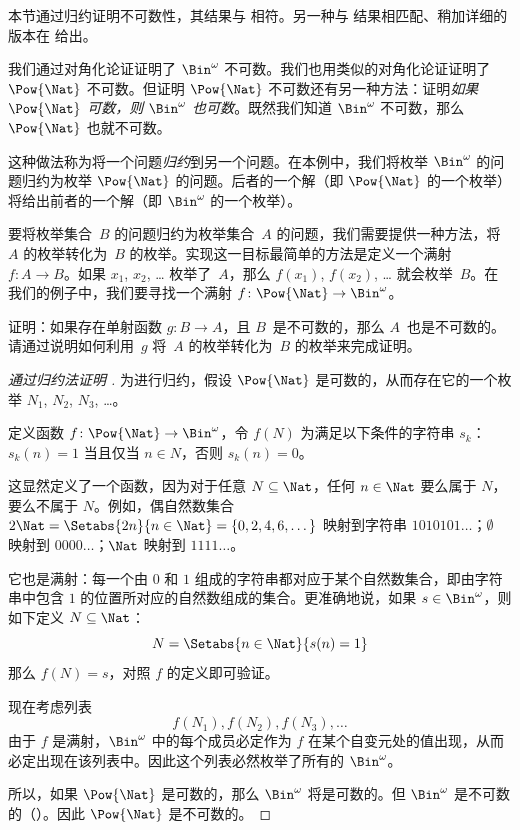 \documentclass[../../../include/open-logic-section]{subfiles}
\begin{document}


\begin{editorial}
  本节通过归约证明不可数性，其结果与  相符。另一种与  结果相匹配、稍加详细的版本在  给出。
\end{editorial}

我们通过对角化论证证明了 $\Bin^\omega$ 不可数。我们也用类似的对角化论证证明了 $\Pow{\Nat}$ 不可数。但证明 $\Pow{\Nat}$ 不可数还有另一种方法：证明\emph{如果 $\Pow{\Nat}$ 可数，则 $\Bin^\omega$ 也可数}。既然我们知道 $\Bin^\omega$ 不可数，那么 $\Pow{\Nat}$ 也就不可数。

这种做法称为将一个问题\emph{归约}到另一个问题。在本例中，我们将枚举 $\Bin^\omega$ 的问题归约为枚举 $\Pow{\Nat}$ 的问题。后者的一个解（即 $\Pow{\Nat}$ 的一个枚举）将给出前者的一个解（即 $\Bin^\omega$ 的一个枚举）。

要将枚举集合~$B$ 的问题归约为枚举集合~$A$ 的问题，我们需要提供一种方法，将~$A$ 的枚举转化为~$B$ 的枚举。实现这一目标最简单的方法是定义一个满射 $f\colon A \to B$。如果 $x_1$, $x_2$, \dots{} 枚举了~$A$，那么 $f(x_1)$, $f(x_2)$, \dots{} 就会枚举~$B$。在我们的例子中，我们要寻找一个满射 $f\colon \Pow{\Nat} \to \Bin^\omega$。

\begin{prob}
证明：如果存在单射函数 $g\colon B \to A$，且 $B$~是不可数的，那么 $A$~也是不可数的。请通过说明如何利用~$g$ 将~$A$ 的枚举转化为~$B$ 的枚举来完成证明。
\end{prob}

\begin{proof}[通过归约法证明 {}]
为进行归约，假设 $\Pow{\Nat}$ 是可数的，从而存在它的一个枚举 $N_{1}$, $N_{2}$, $N_{3}$, \dots。

定义函数 $f \colon \Pow{\Nat} \to \Bin^\omega$，令 $f(N)$ 为满足以下条件的字符串 $s_{k}$：$s_{k}(n) = 1$ 当且仅当 $n \in N$，否则 $s_k(n) = 0$。

这显然定义了一个函数，因为对于任意 $N \subseteq \Nat$，任何 $n \in \Nat$ 要么属于 $N$，要么不属于 $N$。例如，偶自然数集合 $2\Nat = \Setabs{2n}{n \in \Nat} = \{0,2, 4, 6,
\dots\}$ 映射到字符串 $1010101\dots$；$\emptyset$ 映射到 $0000\dots$；$\Nat$ 映射到 $1111\dots$。

它也是满射：每一个由 $0$ 和 $1$ 组成的字符串都对应于某个自然数集合，即由字符串中包含 $1$ 的位置所对应的自然数组成的集合。更准确地说，如果 $s \in \Bin^\omega$，则如下定义 $N \subseteq \Nat$：
\[
N = \Setabs{n \in \Nat}{s(n) = 1}
\]
那么 $f(N) = s$，对照 $f$ 的定义即可验证。

现在考虑列表
\[
f(N_1), f(N_2), f(N_3), \dots
\]
由于 $f$ 是满射，$\Bin^\omega$ 中的每个成员必定作为 $f$ 在某个自变元处的值出现，从而必定出现在该列表中。因此这个列表必然枚举了所有的 $\Bin^\omega$。

所以，如果 $\Pow{\Nat}$ 是可数的，那么 $\Bin^\omega$ 将是可数的。但 $\Bin^\omega$ 是不可数的（）。因此 $\Pow{\Nat}$ 是不可数的。
\end{proof}
\end{document}

